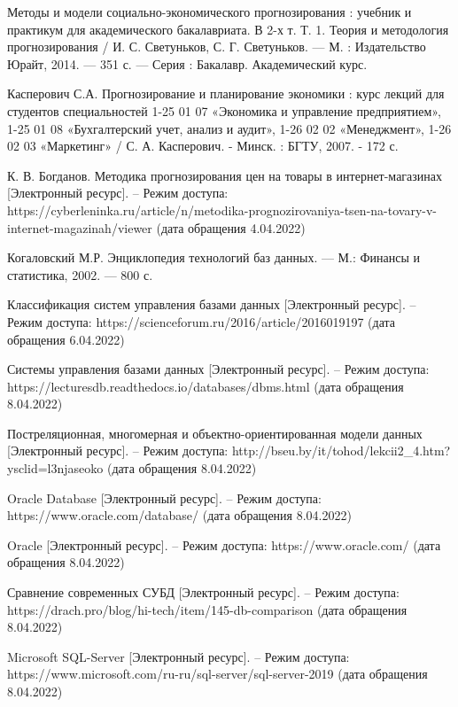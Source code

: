 \documentclass[a4paper,14pt]{extreport}
\begin{document}
\begin{thebibliography}{3}
	 Методы и модели социально-экономического прогнозирования : учебник и практикум для академического бакалавриата. В 2-х т. Т. 1. Теория и методология прогнозирования / И. С. Светуньков, С. Г. Светуньков. — М. : Издательство Юрайт, 2014. — 351 с. — Серия : Бакалавр. Академический курс.
	
	 Касперович С.А. Прогнозирование и планирование экономики : курс лекций для студентов специальностей 1-25 01 07 «Экономика и управление предприятием», 1-25 01 08 «Бухгалтерский учет, анализ и аудит», 1-26 02 02 «Менеджмент», 1-26 02 03 «Маркетинг» / С. А. Касперович. - Минск. : БГТУ, 2007. - 172 с. 
	
	 К. В. Богданов. Методика прогнозирования цен на товары в интернет-магазинах [Электронный ресурс]. -- Режим доступа: https://cyberleninka.ru/article/n/metodika-prognozirovaniya-tsen-na-tovary-v-internet-magazinah/viewer (дата обращения 4.04.2022)
	
	 Когаловский М.Р. Энциклопедия технологий баз данных. — М.: Финансы и статистика, 2002. — 800 с.
	
	 Классификация систем управления базами данных [Электронный ресурс]. -- Режим доступа: https://scienceforum.ru/2016/article/2016019197 (дата обращения 6.04.2022)
	
	 Системы управления базами данных [Электронный ресурс]. -- Режим доступа: https://lecturesdb.readthedocs.io/databases/dbms.html (дата обращения 8.04.2022)
	
	 Постреляционная, многомерная и объектно-ориентированная модели данных [Электронный ресурс]. -- Режим доступа:  http://bseu.by/it/tohod/lekcii2\_4.htm?ysclid=l3njaseoko (дата обращения 8.04.2022)
	
	 Oracle Database [Электронный ресурс]. -- Режим доступа: https://www.oracle.com/database/ (дата обращения 8.04.2022)
	
	 Oracle [Электронный ресурс]. -- Режим доступа: https://www.oracle.com/ (дата обращения 8.04.2022)
	
	 Сравнение современных СУБД [Электронный ресурс]. -- Режим доступа:  https://drach.pro/blog/hi-tech/item/145-db-comparison (дата обращения 8.04.2022)
	
	 Microsoft SQL-Server  [Электронный ресурс]. -- Режим доступа:  https://www.microsoft.com/ru-ru/sql-server/sql-server-2019 (дата обращения 8.04.2022)
	

\end{thebibliography}
\end{document}

